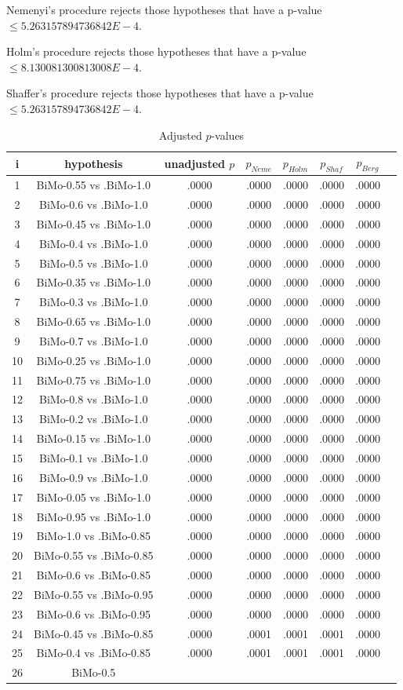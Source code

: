 \documentclass[a4paper,10pt]{article}
\begin{document}
\begin{landscape}
\begin{table}[!htp]
\begin{tabular}{cccccc}
\end{tabular}
\end{table}
Nemenyi's procedure rejects those hypotheses that have a p-value $\le5.263157894736842E-4$.


Holm's procedure rejects those hypotheses that have a p-value $\le8.130081300813008E-4$.


Shaffer's procedure rejects those hypotheses that have a p-value $\le5.263157894736842E-4$.


\begin{table}[!htp]
\centering\tiny
\caption{Adjusted $p$-values}
\begin{tabular}{cccccccc}
i&hypothesis&unadjusted $p$&$p_{Neme}$&$p_{Holm}$&$p_{Shaf}$&$p_{Berg}$\\
\hline
1&BiMo-0.55 vs .BiMo-1.0&.0000&.0000&.0000&.0000&.0000\\2&BiMo-0.6 vs .BiMo-1.0&.0000&.0000&.0000&.0000&.0000\\3&BiMo-0.45 vs .BiMo-1.0&.0000&.0000&.0000&.0000&.0000\\4&BiMo-0.4 vs .BiMo-1.0&.0000&.0000&.0000&.0000&.0000\\5&BiMo-0.5 vs .BiMo-1.0&.0000&.0000&.0000&.0000&.0000\\6&BiMo-0.35 vs .BiMo-1.0&.0000&.0000&.0000&.0000&.0000\\7&BiMo-0.3 vs .BiMo-1.0&.0000&.0000&.0000&.0000&.0000\\8&BiMo-0.65 vs .BiMo-1.0&.0000&.0000&.0000&.0000&.0000\\9&BiMo-0.7 vs .BiMo-1.0&.0000&.0000&.0000&.0000&.0000\\10&BiMo-0.25 vs .BiMo-1.0&.0000&.0000&.0000&.0000&.0000\\11&BiMo-0.75 vs .BiMo-1.0&.0000&.0000&.0000&.0000&.0000\\12&BiMo-0.8 vs .BiMo-1.0&.0000&.0000&.0000&.0000&.0000\\13&BiMo-0.2 vs .BiMo-1.0&.0000&.0000&.0000&.0000&.0000\\14&BiMo-0.15 vs .BiMo-1.0&.0000&.0000&.0000&.0000&.0000\\15&BiMo-0.1 vs .BiMo-1.0&.0000&.0000&.0000&.0000&.0000\\16&BiMo-0.9 vs .BiMo-1.0&.0000&.0000&.0000&.0000&.0000\\17&BiMo-0.05 vs .BiMo-1.0&.0000&.0000&.0000&.0000&.0000\\18&BiMo-0.95 vs .BiMo-1.0&.0000&.0000&.0000&.0000&.0000\\19&BiMo-1.0 vs .BiMo-0.85&.0000&.0000&.0000&.0000&.0000\\20&BiMo-0.55 vs .BiMo-0.85&.0000&.0000&.0000&.0000&.0000\\21&BiMo-0.6 vs .BiMo-0.85&.0000&.0000&.0000&.0000&.0000\\22&BiMo-0.55 vs .BiMo-0.95&.0000&.0000&.0000&.0000&.0000\\23&BiMo-0.6 vs .BiMo-0.95&.0000&.0000&.0000&.0000&.0000\\24&BiMo-0.45 vs .BiMo-0.85&.0000&.0001&.0001&.0001&.0000\\25&BiMo-0.4 vs .BiMo-0.85&.0000&.0001&.0001&.0001&.0000\\26&BiMo-0.5 
\end{tabular}
\end{table}
\end{landscape}
\end{document}
